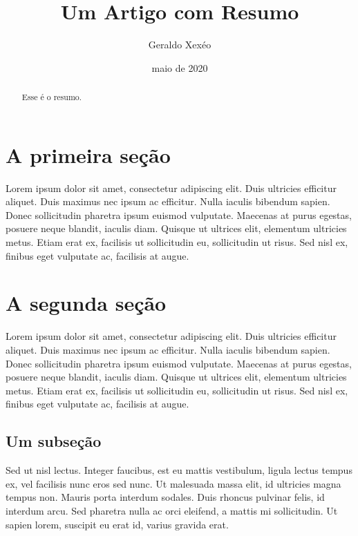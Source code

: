 \documentclass{article}
\title{Um Artigo com Resumo}
\author{Geraldo Xexéo}
\date{maio de 2020}
\begin{document}
    
\maketitle

\begin{abstract}
    Esse é o resumo.
\end{abstract}
    
\section{A primeira seção}

Lorem ipsum dolor sit amet, consectetur adipiscing elit. Duis ultricies efficitur aliquet. Duis maximus nec ipsum ac efficitur. Nulla iaculis bibendum sapien. Donec sollicitudin pharetra ipsum euismod vulputate. Maecenas at purus egestas, posuere neque blandit, iaculis diam. Quisque ut ultrices elit, elementum ultricies metus. Etiam erat ex, facilisis ut sollicitudin eu, sollicitudin ut risus. Sed nisl ex, finibus eget vulputate ac, facilisis at augue. 

\section{A segunda seção}

Lorem ipsum dolor sit amet, consectetur adipiscing elit. Duis ultricies efficitur aliquet. Duis maximus nec ipsum ac efficitur. Nulla iaculis bibendum sapien. Donec sollicitudin pharetra ipsum euismod vulputate. Maecenas at purus egestas, posuere neque blandit, iaculis diam. Quisque ut ultrices elit, elementum ultricies metus. Etiam erat ex, facilisis ut sollicitudin eu, sollicitudin ut risus. Sed nisl ex, finibus eget vulputate ac, facilisis at augue.

\subsection{Um subseção}


Sed ut nisl lectus. Integer faucibus, est eu mattis vestibulum, ligula lectus tempus ex, vel facilisis nunc eros sed nunc. Ut malesuada massa elit, id ultricies magna tempus non. Mauris porta interdum sodales. Duis rhoncus pulvinar felis, id interdum arcu. Sed pharetra nulla ac orci eleifend, a mattis mi sollicitudin. Ut sapien lorem, suscipit eu erat id, varius gravida erat.
    
    
\end{document}
